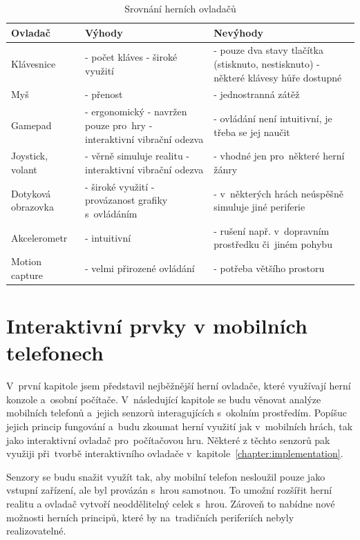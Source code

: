 \documentclass[thesis=B,czech,hidelinks]{FITthesis}[2012/06/26] %
\begin{document}
\begin{table}[h]
\caption{Srovnání herních ovladačů}
\begin{tabularx}{\textwidth}{|l|X|X|}
\hline
\textbf{Ovladač} & \textbf{Výhody} & \textbf{Nevýhody} \\ \hline
Klávesnice & - počet kláves \newline - široké využití & - pouze dva stavy tlačítka (stisknuto, nestisknuto) \newline - některé klávesy hůře dostupné \\ \hline
Myš & - přenost & - jednostranná zátěž \\ \hline
Gamepad & - ergonomický \newline - navržen pouze pro~hry \newline - interaktivní vibrační odezva & - ovládání není intuitivní, je třeba se jej naučit \\ \hline
Joystick, volant & - věrně simuluje realitu \newline - interaktivní vibrační odezva & - vhodné jen pro~některé herní žánry \\ \hline
Dotyková obrazovka & - široké využití \newline - provázanost grafiky s~ovládáním & - v~některých hrách neúspěšně simuluje jiné periferie \\ \hline
Akcelerometr & - intuitivní & - rušení např. v~dopravním prostředku či~jiném pohybu \\ \hline
Motion capture & - velmi přirozené ovládání & - potřeba většího prostoru \\ \hline

\end{tabularx}
\end{table}


\chapter{Interaktivní prvky v mobilních telefonech}

V~první kapitole jsem představil nejběžnější herní ovladače, které využívají herní konzole a~osobní počítače. V~následující kapitole se budu věnovat analýze mobilních telefonů a~jejich senzorů interagujících s~okolním prostředím. Popíšuc jejich princip fungování a~budu zkoumat herní využití jak v~mobilních hrách, tak jako interaktivní ovladač pro~počítačovou hru. Některé z těchto senzorů pak využiji při~tvorbě interaktivního ovladače v~kapitole~\ref{chapter:implementation}.

Senzory se budu snažit využít tak, aby mobilní telefon nesloužil pouze jako vstupní zařízení, ale byl provázán s~hrou samotnou. To umožní rozšířit herní realitu a ovladač vytvoří neoddělitelný celek s~hrou. Zároveň to nabídne nové možnosti herních principů, které by na~tradičních periferiích nebyly realizovatelné.
\end{document}

